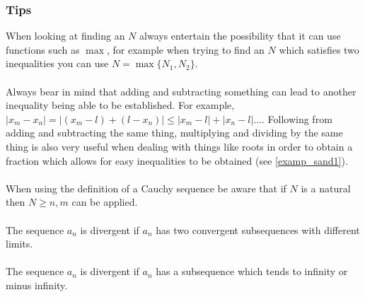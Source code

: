 \documentclass[10pt, a4paper]{article}
\begin{document}
\newpage

\subsubsection{Tips}
When looking at finding an $N$ always entertain the possibility that it can use functions such as $\max$, for example when trying to find an $N$ which satisfies two inequalities you can use $N = \max{\{N_1, N_2\}}$. \\
\\
Always bear in mind that adding and subtracting something can lead to another inequality being able to be established. For example, $|x_m - x_n| = |(x_m - l) + (l - x_n)| \leq |x_m - l| + |x_n - l|\dotsc$. Following from adding and subtracting the same thing, multiplying and dividing by the same thing is also very useful when dealing with things like roots in order to obtain a fraction which allows for easy inequalities to be obtained (see \autoref{examp_sand1}). \\
\\
When using the definition of a Cauchy sequence be aware that if $N$ is a natural then $N \geq n, m$ can be applied. \\
\\
The sequence $a_n$ is divergent if $a_n$ has two convergent subsequences with different limits. \\
\\
The sequence $a_n$ is divergent if $a_n$ has a subsequence which tends to infinity or minus infinity.
\end{document}
